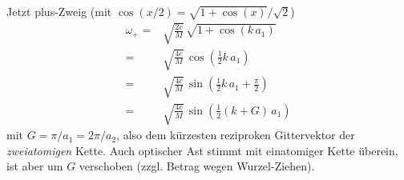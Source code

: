 Jetzt plus-Zweig (mit $\cos(x/2) = \sqrt{ 1+\cos(x) } / \sqrt{2}$)
\begin{align}
\omega_{+} =  & \sqrt{\frac{2c}{M}} \, \sqrt{1 + 
  \cos \left(   k \, a_1 \right) }  \\
=  & \sqrt{\frac{4c}{M}} \, 
  \cos \left( \frac{1}{2}   k \, a_1 \right)  \\
  =  & \sqrt{\frac{4c}{M}} \, 
  \sin \left( \frac{1}{2}   k \, a_1 + \frac{\pi}{2} \right)  \\
    =  & \sqrt{\frac{4c}{M}} \, 
  \sin \left( \frac{1}{2}   (k + G)  \, a_1 \right) 
\end{align}
mit $G   =\pi / a_1 = 2 \pi / a_2$, also dem kürzesten reziproken Gittervektor der \emph{zweiatomigen} Kette. Auch optischer Ast stimmt mit einatomiger Kette überein, ist aber um $G$ verschoben (zzgl. Betrag wegen Wurzel-Ziehen).




